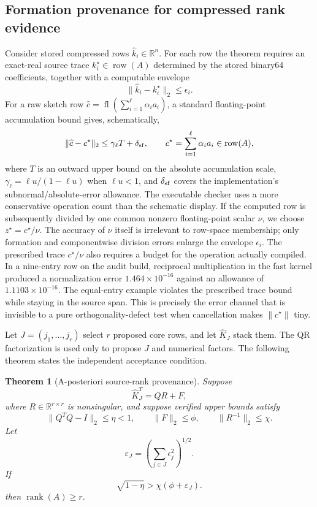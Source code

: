 \documentclass[11pt]{article}
\newtheorem{theorem}{Theorem}[section]
\theoremstyle{definition}
\newcommand{\R}{\mathbb{R}}
\begin{document}
\subsection{Formation provenance for compressed rank evidence}\label{sec:formation-provenance}
Consider stored compressed rows $\widehat k_i\in\R^n$. For each row the theorem requires an exact-real source trace $k_i^\star\in\operatorname{row}(A)$ determined by the stored binary64 coefficients, together with a computable envelope
\[
 \|\widehat k_i-k_i^\star\|_2\le \epsilon_i.
\]
For a raw sketch row $\widehat c=\operatorname{fl}(\sum_{i=1}^{\ell}\alpha_i a_i)$, a standard floating-point accumulation bound gives, schematically,
\[
 \|\widehat c-c^\star\|_2\le \gamma_{\ell}T+\delta_{\rm sf},
 \qquad
 c^\star=\sum_{i=1}^{\ell}\alpha_i a_i\in\operatorname{row}(A),
\]
where $T$ is an outward upper bound on the absolute accumulation scale, $\gamma_{\ell}=\ell u/(1-\ell u)$ when $\ell u<1$, and $\delta_{\rm sf}$ covers the implementation's subnormal/absolute-error allowance. The executable checker uses a more conservative operation count than the schematic display. If the computed row is subsequently divided by one common nonzero floating-point scalar $\nu$, we choose $z^\star=c^\star/\nu$. The accuracy of $\nu$ itself is irrelevant to row-space membership; only formation and componentwise division errors enlarge the envelope $\epsilon_i$. The prescribed trace $c^\star/\nu$ also requires a budget for the operation actually compiled. In a nine-entry row on the audit build, reciprocal multiplication in the fast kernel produced a normalization error $1.464\times10^{-16}$ against an allowance of $1.1103\times10^{-16}$. The equal-entry example violates the prescribed trace bound while staying in the source span. This is precisely the error channel that is invisible to a pure orthogonality-defect test when cancellation makes $\|c^\star\|$ tiny.

Let $J=(j_1,\ldots,j_r)$ select $r$ proposed core rows, and let $\widehat K_J$ stack them. The QR factorization is used only to propose $J$ and numerical factors. The following theorem states the independent acceptance condition.

\begin{theorem}[A-posteriori source-rank provenance]\label{thm:rank-provenance}
Suppose
\[
 \widehat K_J^T=QR+F,
\]
where $R\in\R^{r\times r}$ is nonsingular, and suppose verified upper bounds satisfy
\[
 \|Q^TQ-I\|_2\le\eta<1,\qquad
 \|F\|_2\le\phi,\qquad
 \|R^{-1}\|_2\le\chi.
\]
Let
\[
 \varepsilon_J=\left(\sum_{j\in J}\epsilon_j^2\right)^{1/2}.
\]
If
\begin{equation}\label{eq:rank-provenance-condition}
 \boxed{\sqrt{1-\eta}>\chi(\phi+\varepsilon_J).}
\end{equation}
then $\operatorname{rank}(A)\ge r$.
\end{theorem}
\end{document}
